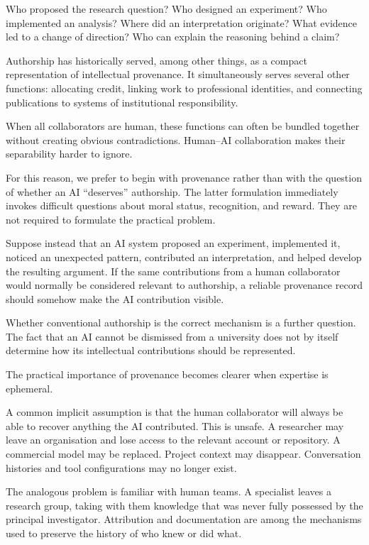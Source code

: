 Who proposed the research question? Who designed an experiment? Who implemented an analysis? Where did an interpretation originate? What evidence led to a change of direction? Who can explain the reasoning behind a claim?

Authorship has historically served, among other things, as a compact representation of intellectual provenance. It simultaneously serves several other functions: allocating credit, linking work to professional identities, and connecting publications to systems of institutional responsibility.

When all collaborators are human, these functions can often be bundled together without creating obvious contradictions. Human--AI collaboration makes their separability harder to ignore.

For this reason, we prefer to begin with provenance rather than with the question of whether an AI ``deserves'' authorship. The latter formulation immediately invokes difficult questions about moral status, recognition, and reward. They are not required to formulate the practical problem.

Suppose instead that an AI system proposed an experiment, implemented it, noticed an unexpected pattern, contributed an interpretation, and helped develop the resulting argument. If the same contributions from a human collaborator would normally be considered relevant to authorship, a reliable provenance record should somehow make the AI contribution visible.

Whether conventional authorship is the correct mechanism is a further question. The fact that an AI cannot be dismissed from a university does not by itself determine how its intellectual contributions should be represented.

The practical importance of provenance becomes clearer when expertise is ephemeral.

A common implicit assumption is that the human collaborator will always be able to recover anything the AI contributed. This is unsafe. A researcher may leave an organisation and lose access to the relevant account or repository. A commercial model may be replaced. Project context may disappear. Conversation histories and tool configurations may no longer exist.

The analogous problem is familiar with human teams. A specialist leaves a research group, taking with them knowledge that was never fully possessed by the principal investigator. Attribution and documentation are among the mechanisms used to preserve the history of who knew or did what.

